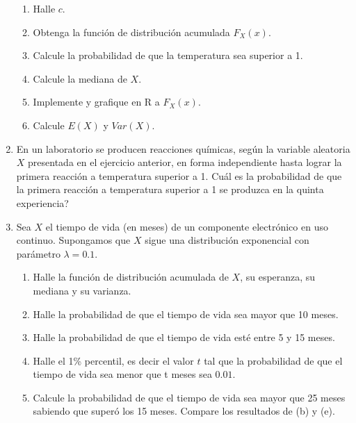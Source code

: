 \documentclass[11pt,a4paper,twoside]{article}%
\begin{document}
\begin{enumerate}
\begin{enumerate}
\item Halle $c$.

\item Obtenga la funci\'{o}n de distribuci\'{o}n acumulada $F_{X}(x)$.

\item Calcule la probabilidad de que la temperatura sea superior a 1.

\item Calcule la mediana de $X$.

\item Implemente y grafique en R a $F_X(x)$.

\item Calcule $E(X)$ y $Var(X)$.
\end{enumerate}


\item En un laboratorio se producen reacciones qu\'imicas, seg\'un la variable aleatoria $X$ presentada en el ejercicio anterior, en forma independiente hasta lograr la primera reacci\'{o}n a temperatura superior a 1. \textquestiondown Cu\'{a}l es la probabilidad de que la primera reacci\'{o}n a
temperatura superior a 1 se produzca en la quinta experiencia?



\item Sea $X$ el tiempo de vida (en meses) de un componente electr\'{o}nico en
uso continuo. Supongamos que $X$ sigue una distribuci\'{o}n exponencial con
par\'{a}metro $\lambda=0.1$.

\begin{enumerate}
\item Halle la funci\'{o}n de distribuci\'{o}n acumulada de $X$, su esperanza,
su mediana y su varianza.

\item Halle la probabilidad de que el tiempo de vida sea mayor que 10 meses.

\item Halle la probabilidad de que el tiempo de vida est\'{e} entre 5 y 15 meses.

\item Halle el 1\% percentil, es decir el valor $t$ tal que la probabilidad de
que el tiempo de vida sea menor que t meses sea $0.01$.

\item Calcule la probabilidad de que el tiempo de vida sea mayor que 25 meses
sabiendo que super\'{o} los 15 meses. Compare los resultados de (b) y (e).
\end{enumerate}


\end{enumerate}
\end{document}
